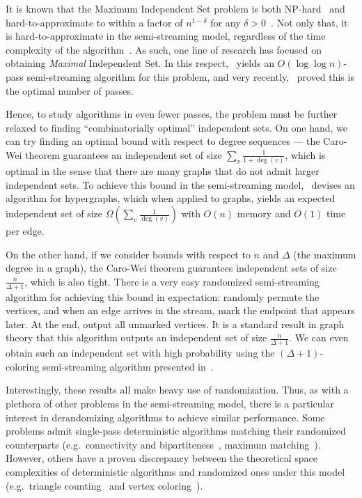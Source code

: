 \documentclass[11pt]{article}
\theoremstyle{definition}
\begin{document}
It is known that the Maximum Independent Set problem is both NP-hard\ \cite{karp2010reducibility} and hard-to-approximate to within a factor of $n^{1-\delta}$ for any $\delta>0$\ \cite{zuckerman2006linear}. Not only that, it is hard-to-approximate in the semi-streaming model, regardless of the time complexity of the algorithm\ \cite{halldorsson2012streaming}. As such, one line of research has focused on obtaining \textit{Maximal} Independent Set. In this respect,~\cite{ahn2015correlation} yields an $O(\log \log n)$-pass semi-streaming algorithm for this problem, and very recently,\ \cite{assadi2024log} proved this is the optimal number of passes.
\vspace{-0.05cm}

Hence, to study algorithms in even fewer passes, the problem must be further relaxed to finding ``combinatorially optimal'' independent sets. On one hand, we can try finding an optimal bound with respect to degree sequences --- the Caro-Wei theorem guarantees an independent set of size $\sum_{v}\frac 1{1+\deg(v)}$, which is optimal in the sense that there are many graphs that do not admit larger independent sets. To achieve this bound in the semi-streaming model,~\cite{halldorsson2010streaming} devises an algorithm for hypergraphs, which when applied to graphs, yields an expected independent set of size $\Omega\left(\sum_{v}\frac 1{\deg(v)}\right)$ with $O(n)$ memory and $O(1)$ time per edge. 
\vspace{-0.05cm}

On the other hand, if we consider bounds with respect to $n$ and $\Delta$ (the maximum degree in a graph), the Caro-Wei theorem guarantees independent sets of size $\frac{n}{\Delta+1}$, which is also tight. There is a very easy randomized semi-streaming algorithm for achieving this bound in expectation: randomly permute the vertices, and when an edge arrives in the stream, mark the endpoint that appears later. At the end, output all unmarked vertices. It is a standard result in graph theory that this algorithm outputs an independent set of size $\frac n{\Delta+1}$. We can even obtain such an independent set with high probability using the $(\Delta+1)$-coloring semi-streaming algorithm presented in~\cite{assadi2019sublinear}.
\vspace{-0.05cm}

Interestingly, these results all make heavy use of randomization. Thus, as with a plethora of other problems in the semi-streaming model, there is a particular interest in derandomizing algorithms to achieve similar performance. Some problems admit single-pass deterministic algorithms matching their randomized counterparts (e.g.\ connectivity and bipartiteness~\cite{ahn2012analyzing}, maximum matching~\cite{paz20182+}). However, others have a proven discrepancy between the theoretical space complexities of deterministic algorithms and randomized ones under this model (e.g.\ triangle counting~\cite{braverman2013hard} and vertex coloring~\cite{assadi2022deterministic}). 
\vspace{-0.05cm}
\end{document}
